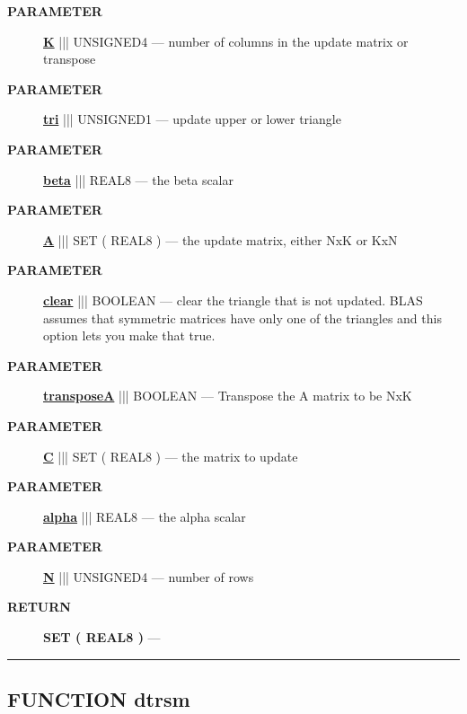 \par
\begin{description}
\item [\colorbox{tagtype}{\color{white} \textbf{\textsf{PARAMETER}}}] \textbf{\underline{K}} ||| UNSIGNED4 --- number of columns in the update matrix or transpose
\item [\colorbox{tagtype}{\color{white} \textbf{\textsf{PARAMETER}}}] \textbf{\underline{tri}} ||| UNSIGNED1 --- update upper or lower triangle
\item [\colorbox{tagtype}{\color{white} \textbf{\textsf{PARAMETER}}}] \textbf{\underline{beta}} ||| REAL8 --- the beta scalar
\item [\colorbox{tagtype}{\color{white} \textbf{\textsf{PARAMETER}}}] \textbf{\underline{A}} ||| SET ( REAL8 ) --- the update matrix, either NxK or KxN
\item [\colorbox{tagtype}{\color{white} \textbf{\textsf{PARAMETER}}}] \textbf{\underline{clear}} ||| BOOLEAN --- clear the triangle that is not updated. BLAS assumes that symmetric matrices have only one of the triangles and this option lets you make that true.
\item [\colorbox{tagtype}{\color{white} \textbf{\textsf{PARAMETER}}}] \textbf{\underline{transposeA}} ||| BOOLEAN --- Transpose the A matrix to be NxK
\item [\colorbox{tagtype}{\color{white} \textbf{\textsf{PARAMETER}}}] \textbf{\underline{C}} ||| SET ( REAL8 ) --- the matrix to update
\item [\colorbox{tagtype}{\color{white} \textbf{\textsf{PARAMETER}}}] \textbf{\underline{alpha}} ||| REAL8 --- the alpha scalar
\item [\colorbox{tagtype}{\color{white} \textbf{\textsf{PARAMETER}}}] \textbf{\underline{N}} ||| UNSIGNED4 --- number of rows
\end{description}







\par
\begin{description}
\item [\colorbox{tagtype}{\color{white} \textbf{\textsf{RETURN}}}] \textbf{SET ( REAL8 )} --- 
\end{description}




\rule{\linewidth}{0.5pt}
\subsection*{\textsf{\colorbox{headtoc}{\color{white} FUNCTION}
dtrsm}}

